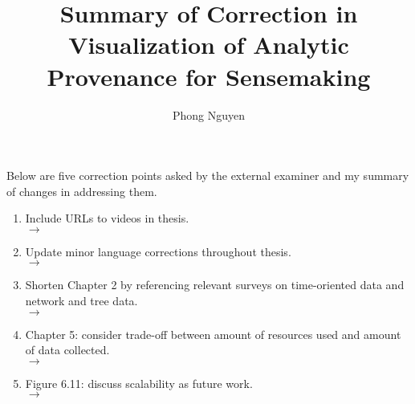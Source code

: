 \documentclass[12pt]{article}
\title{Summary of Correction in \\\textbf{Visualization of Analytic Provenance for Sensemaking}}
\author{Phong Nguyen}
\begin{document}
\maketitle

Below are five correction points asked by the external examiner and my summary of changes in addressing them.

\begin{enumerate}
	\item Include URLs to videos in thesis.
	\\ $\rightarrow$
	
	\item Update minor language corrections throughout thesis.
	\\ $\rightarrow$
	
	\item Shorten Chapter 2 by referencing relevant surveys on time-oriented data and network and tree data.
	\\ $\rightarrow$
	
	\item Chapter 5: consider trade-off between amount of resources used and amount of data collected.
	\\ $\rightarrow$
	
	\item Figure 6.11: discuss scalability as future work.
	\\ $\rightarrow$
\end{enumerate}
\end{document}
